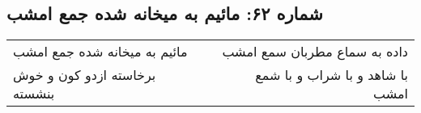 \begin{center}
\section*{شماره ۶۲: مائیم به میخانه شده جمع امشب}
\label{sec:062}
\begin{longtable}{l p{0.5cm} r}
مائیم به میخانه شده جمع امشب
&&
داده به سماع مطربان سمع امشب
\\
برخاسته ازدو کون و خوش بنشسته
&&
با شاهد و با شراب و با شمع امشب
\\
\end{longtable}
\end{center}

